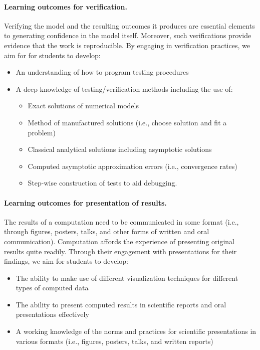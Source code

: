 \documentclass[%
oneside,                 %
final,                   %
10pt]{article}
\begin{document}
\noindent
\paragraph{Learning outcomes for verification.}
Verifying the model and the resulting outcomes it produces are essential elements to generating confidence in the model itself. Moreover, such verifications provide evidence that the work is reproducible. By engaging in verification practices, we aim for for students to develop:

\begin{itemize}
\item An understanding of how to program testing procedures

\item A deep knowledge of testing/verification methods including the use of:
\begin{itemize}

  \item Exact solutions of numerical models

  \item Method of manufactured solutions (i.e., choose solution and fit a problem)

  \item Classical analytical solutions including asymptotic solutions

  \item Computed asymptotic approximation errors (i.e., convergence rates)

  \item Step-wise construction of tests to aid debugging.
\end{itemize}

\noindent
\end{itemize}

\noindent
\paragraph{Learning outcomes for presentation of results.}
The results of a computation need to be communicated in some format (i.e., through figures, posters, talks, and other forms of written and oral communication). Computation affords the experience of presenting original results quite readily. Through their engagement with presentations for their findings, we aim for students to develop:

\begin{itemize}
\item The ability to make use of different visualization techniques for different types of computed data

\item The ability to present computed results in scientific reports and oral presentations effectively

\item A working knowledge of the norms and practices for scientific presentations in various formats (i.e., figures, posters, talks, and written reports)
\end{itemize}
\end{document}
